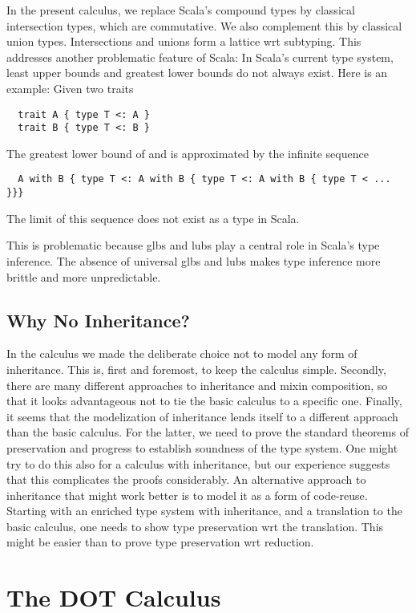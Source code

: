 \documentclass{llncs}
\begin{document}
In the present calculus, we replace Scala's compound types by
classical intersection types, which are commutative. We also
complement this by classical union types. Intersections and unions
form a lattice wrt subtyping. This addresses another problematic
feature of Scala: In Scala's current type system, least upper bounds
and greatest lower bounds do not always exist. Here is an example:
Given two traits
\begin{lstlisting}
  trait A { type T <: A }
  trait B { type T <: B }
\end{lstlisting}
The greatest lower bound of \c@A@ and \c@B@ is approximated by the
infinite sequence
\begin{lstlisting}
  A with B { type T <: A with B { type T <: A with B { type T < ... }}}
\end{lstlisting}
The limit of this sequence does not exist as a type in Scala.

This is problematic because glbs and lubs play a central role in
Scala's type inference. The absence of universal glbs and lubs makes
type inference more brittle and more unpredictable.

\subsection*{Why No Inheritance?}

In the calculus we made the deliberate choice not to model any form of
inheritance. This is, first and foremost, to keep the calculus simple.
Secondly, there are many different approaches to inheritance and
mixin composition, so that it looks advantageous not to tie the basic
calculus to a specific one. Finally, it seems that the modelization of
inheritance lends itself to a different approach than the basic
calculus. For the latter, we need to prove the standard theorems of
preservation and progress to establish soundness of the type system.
One might try to do this also for a calculus with inheritance, but our
experience suggests that this complicates the proofs considerably.  An
alternative approach to inheritance that might work better is to model
it as a form of code-reuse. Starting with an enriched type system with
inheritance, and a translation to the basic calculus, one needs to
show type preservation wrt the translation. This might be easier than
to prove type preservation wrt reduction.


\section{The DOT Calculus}
\end{document}
